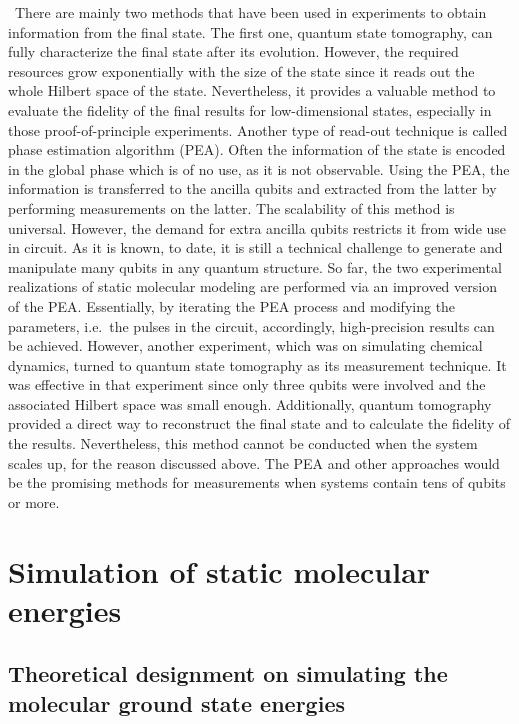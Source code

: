\documentclass[8.5pt,twoside,twocolumn]{article}
\begin{document}
\ There are mainly two methods that have been used in
experiments to obtain information from the final state.
The first one, quantum state tomography, can fully
characterize the final state after its evolution.
However, the required resources grow exponentially
with the size of the state since it reads out the whole
Hilbert space of the state. Nevertheless, it provides a valuable method
to evaluate the fidelity of the final results
for low-dimensional states, especially in those proof-of-principle experiments.
Another type of read-out technique is called
phase estimation algorithm (PEA).\cite{PEA_1,PEA_2,PEA_3,PEA_4}
Often the information of the state is encoded in the global phase
which is of no use, as it is not observable.
Using the PEA, the information is transferred to the ancilla qubits
and extracted from the latter by performing measurements on the latter.
The scalability of this method is universal.
However, the demand for extra ancilla qubits
restricts it from wide use in circuit.
As it is known, to date, it is still a technical challenge
to generate and manipulate many qubits in any quantum structure.
So far, the two experimental realizations of static molecular modeling
are performed via an improved version of
the PEA.\cite{Optics_static,NMR_static}
Essentially, by iterating the PEA process
and modifying the parameters, i.e.\
the pulses in the circuit, accordingly,
high-precision results can be achieved.
However, another experiment,\cite{NMR_dynamic}
which was on simulating chemical dynamics,
turned to quantum state tomography as its measurement technique.
It was effective in that experiment
since only three qubits were involved
and the associated Hilbert space was small enough.
Additionally, quantum tomography provided a direct way
to reconstruct the final state and to calculate the fidelity
of the results. Nevertheless,
this method cannot be conducted when the system scales up,
for the reason discussed above.
The PEA and other approaches\cite{Other_measuring_methods_1,Other_measuring_methods_2,Other_measuring_methods_3,Other_measuring_methods_4}
would be the promising methods for measurements
when systems contain tens of qubits or more.

\section{Simulation of static molecular energies}

\subsection{Theoretical designment on simulating the molecular ground state energies}
\end{document}
